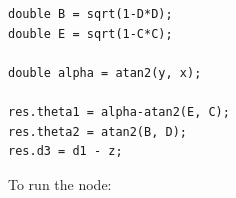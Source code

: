 \documentclass[10pt]{article}
\begin{document}
\begin{enumerate}
\begin{lstlisting}[style=Matlab-editor,basicstyle=\mlttfamily,escapechar=`]
double B = sqrt(1-D*D);
double E = sqrt(1-C*C);

double alpha = atan2(y, x);

res.theta1 = alpha-atan2(E, C);
res.theta2 = atan2(B, D);
res.d3 = d1 - z;
\end{lstlisting}

To run the node:


\end{enumerate}
\end{document}
